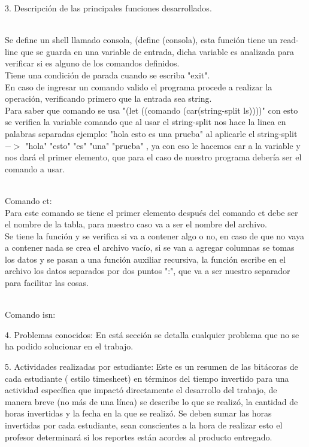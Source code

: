 \documentclass[12pt,a4paper]{report}
\begin{document}
\begin{flushleft}
3. Descripción de las principales funciones desarrollados.\\\

Se define un shell llamado consola, (define (consola), esta función tiene un read-line que se guarda en una variable de entrada, dicha variable es analizada
para verificar si es alguno de los comandos definidos.\\
Tiene una condición de parada cuando se escriba "exit".\\
En caso de ingresar un comando valido el programa procede a realizar la operación, verificando primero que la entrada sea string.\\
Para saber que comando se usa "(let ((comando (car(string-split ls))))" con esto se verifica la variable comando que al usar el string-split nos hace la linea
en palabras separadas ejemplo: "hola esto es una prueba"  al aplicarle el string-split $->$ "hola" "esto" "es" "una" "prueba" , ya con eso le hacemos car a 
la variable y nos dará el primer elemento, que para el caso de nuestro programa debería ser el comando a usar.\\\

Comando ct:\\
Para este comando se tiene el primer elemento después del comando ct debe ser el nombre de la tabla, para nuestro caso va a ser el nombre del archivo.\\
Se tiene la función y se verifica si va a contener algo o no, en caso de que no vaya a contener nada se crea el archivo vacío, si se van a agregar columnas
se tomas los datos y se pasan a una función auxiliar recursiva, la función escribe en el archivo los datos separados por dos puntos ":", que va a ser nuestro
separador para facilitar las cosas.\\\

Comando isn:


\end{flushleft}

\begin{flushleft}

4. Problemas conocidos: En está sección se detalla cualquier problema que no se ha podido solucionar en el trabajo.

\end{flushleft}

\begin{flushleft}
5. Actividades realizadas por estudiante: Este es un resumen de las bitácoras
de cada estudiante ( estilo timesheet) en términos del tiempo invertido para
una actividad específica que impactó directamente el desarrollo del trabajo,
de manera breve (no más de una línea) se describe lo que se realizó, la
cantidad de horas invertidas y la fecha en la que se realizó. Se deben sumar
las horas invertidas por cada estudiante, sean conscientes a la hora de
realizar esto el profesor determinará si los reportes están acordes al
producto entregado.

\end{flushleft}
\end{document}
